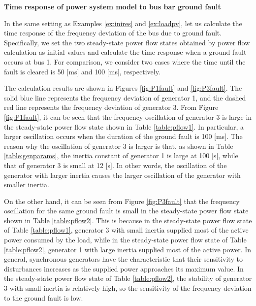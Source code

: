 \documentclass[graybox, envcountchap]{svmult}
\begin{document}
\begin{example}{\textbf{Time response of power system model to bus bar ground fault}}\label{ex:busflt}

In the same setting as Examples \ref{ex:inires} and \ref{ex:loadpv}, let us
calculate the time response of the frequency deviation of the bus due to ground
fault. Specifically, we set the two steady-state power flow states obtained by
power flow calculation as initial values and calculate the time response when a
ground fault occurs at bus 1. For comparison, we consider two cases where the
time until the fault is cleared is 50 [ms] and 100 [ms], respectively.

The calculation results are shown in Figures \ref{fig:P1fault} and
\ref{fig:P3fault}.  The solid blue line represents the frequency deviation of
generator 1, and the dashed red line represents the frequency deviation of
generator 3.  From Figure \ref{fig:P1fault}, it can be seen that the frequency
oscillation of generator 3 is large in the steady-state power flow state shown
in Table \ref{table:pflow1}.  In particular, a larger oscillation occurs when
the duration of the ground fault is 100 [ms].  The reason why the oscillation of
generator 3 is larger is that, as shown in Table \ref{table:genparams}, the
inertia constant of generator 1 is large at 100 [s], while that of generator 3
is small at 12 [s].  In other words, the oscillation of the generator with
larger inertia causes the larger oscillation of the generator with smaller
inertia.

On the other hand, it can be seen from Figure \ref{fig:P3fault} that the frequency
oscillation for the same ground fault is small in the steady-state power flow
state shown in Table \ref{table:pflow2}. This is because in the steady-state
power flow state of Table \ref{table:pflow1}, generator 3 with small inertia
supplied most of the active power consumed by the load, while in the
steady-state power flow state of Table \ref{table:pflow2}, generator 1 with
large inertia supplied most of the active power. In general, synchronous
generators have the characteristic that their sensitivity to disturbances
increases as the supplied power approaches its maximum value. In the
steady-state power flow state of Table \ref{table:pflow2}, the stability of
generator 3 with small inertia is relatively high, so the sensitivity of the
frequency deviation to the ground fault is low.
\end{example}
\end{document}
